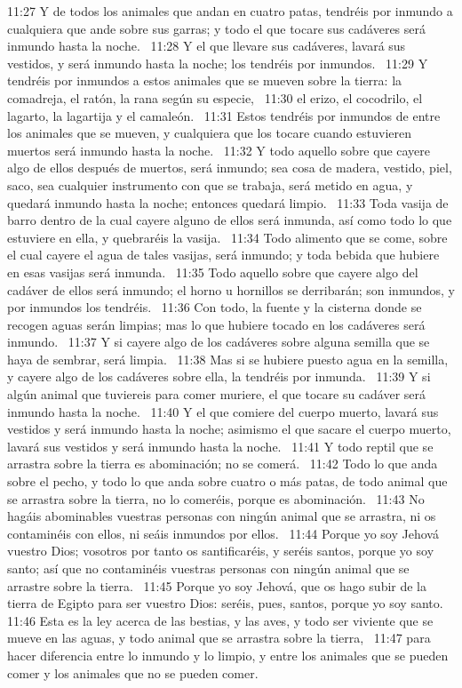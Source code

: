 11:27 Y de todos los animales que andan en cuatro patas, tendréis por inmundo a cualquiera que ande sobre sus garras; y todo el que tocare sus cadáveres será inmundo hasta la noche.  
11:28 Y el que llevare sus cadáveres, lavará sus vestidos, y será inmundo hasta la noche; los tendréis por inmundos.  
11:29 Y tendréis por inmundos a estos animales que se mueven sobre la tierra: la comadreja, el ratón, la rana según su especie,  
11:30 el erizo, el cocodrilo, el lagarto, la lagartija y el camaleón.  
11:31 Estos tendréis por inmundos de entre los animales que se mueven, y cualquiera que los tocare cuando estuvieren muertos será inmundo hasta la noche.  
11:32 Y todo aquello sobre que cayere algo de ellos después de muertos, será inmundo; sea cosa de madera, vestido, piel, saco, sea cualquier instrumento con que se trabaja, será metido en agua, y quedará inmundo hasta la noche; entonces quedará limpio.  
11:33 Toda vasija de barro dentro de la cual cayere alguno de ellos será inmunda, así como todo lo que estuviere en ella, y quebraréis la vasija.  
11:34 Todo alimento que se come, sobre el cual cayere el agua de tales vasijas, será inmundo; y toda bebida que hubiere en esas vasijas será inmunda.  
11:35 Todo aquello sobre que cayere algo del cadáver de ellos será inmundo; el horno u hornillos se derribarán; son inmundos, y por inmundos los tendréis.  
11:36 Con todo, la fuente y la cisterna donde se recogen aguas serán limpias; mas lo que hubiere tocado en los cadáveres será inmundo.  
11:37 Y si cayere algo de los cadáveres sobre alguna semilla que se haya de sembrar, será limpia.  
11:38 Mas si se hubiere puesto agua en la semilla, y cayere algo de los cadáveres sobre ella, la tendréis por inmunda.  
11:39 Y si algún animal que tuviereis para comer muriere, el que tocare su cadáver será inmundo hasta la noche.  
11:40 Y el que comiere del cuerpo muerto, lavará sus vestidos y será inmundo hasta la noche; asimismo el que sacare el cuerpo muerto, lavará sus vestidos y será inmundo hasta la noche.  
11:41 Y todo reptil que se arrastra sobre la tierra es abominación; no se comerá.  
11:42 Todo lo que anda sobre el pecho, y todo lo que anda sobre cuatro o más patas, de todo animal que se arrastra sobre la tierra, no lo comeréis, porque es abominación.  
11:43 No hagáis abominables vuestras personas con ningún animal que se arrastra, ni os contaminéis con ellos, ni seáis inmundos por ellos.  
11:44 Porque yo soy Jehová vuestro Dios; vosotros por tanto os santificaréis, y seréis santos, porque yo soy santo; así que no contaminéis vuestras personas con ningún animal que se arrastre sobre la tierra.  
11:45 Porque yo soy Jehová, que os hago subir de la tierra de Egipto para ser vuestro Dios: seréis, pues, santos, porque yo soy santo.  
11:46 Esta es la ley acerca de las bestias, y las aves, y todo ser viviente que se mueve en las aguas, y todo animal que se arrastra sobre la tierra,  
11:47 para hacer diferencia entre lo inmundo y lo limpio, y entre los animales que se pueden comer y los animales que no se pueden comer.  
